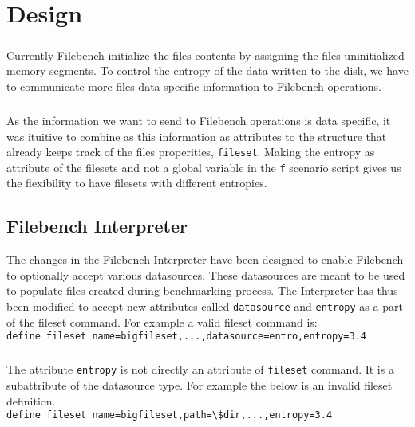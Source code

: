 \chapter{Design}\label{chap:des}

\paragraph{}
Currently Filebench initialize the files contents by assigning the files uninitialized memory segments.
 To control the entropy of the data written to the disk, we have to communicate more files data specific information to Filebench operations.

\paragraph{}
As the information we want to send to Filebench operations is data specific, it was ituitive to combine as this information as attributes to the structure that already keeps track of the files properities, \verb+fileset+.
Making the entropy as attribute of the filesets and not a global variable in the \verb+f+ scenario script gives us the flexibility to have filesets with different entropies.\\

\section{Filebench Interpreter}
The changes in the Filebench Interpreter have been designed to enable Filebench to optionally accept various datasources. These datasources are meant to be used to populate files created during benchmarking process. The Interpreter has thus been modified to accept new attributes called \verb+datasource+ and \verb+entropy+ as a part of the fileset command. For example a valid fileset command is:\\

\indent \verb+define fileset name=bigfileset,...,datasource=entro,entropy=3.4+
\paragraph{}
The attribute \verb+entropy+ is not directly an attribute of \verb+fileset+ command. It is a subattribute of the datasource type. For example the below is an invalid fileset definition.\\


\verb+define fileset name=bigfileset,path=\$dir,...,entropy=3.4+\\
